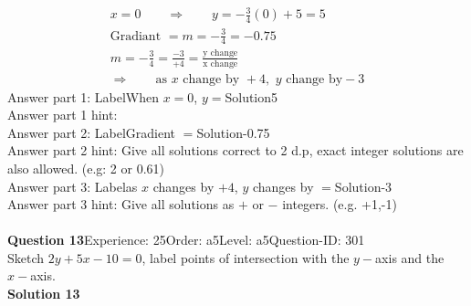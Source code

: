 \documentclass{article}
\begin{document}
\\[-35pt]\begin{align*}
&x=0\qquad\Rightarrow\qquad y=-\displaystyle\frac{3}{4}(0)+5=5&\\[2pt]
&\text{Gradiant}\,\,=m=-\displaystyle\frac{3}{4}=-0.75&\\[2pt]
&m=-\displaystyle\frac{3}{4}=\displaystyle\frac{-3}{+4}=\displaystyle\frac{\text{y change}}{\text{x change}}&\\[2pt]
& \Rightarrow\qquad \text{as}\,\, x \,\,\text{change by } +4,\,\, y\,\, \text{change by} -3 &
\end{align*}
Answer part 1: \hspace{10pt}Label\hspace{10pt}When $x=0$, $y=$\hspace{10pt}Solution\hspace{10pt}5\\
Answer part 1 hint: \hspace{15pt}\\
Answer part 2: \hspace{10pt}Label\hspace{10pt}Gradient $=$\hspace{10pt}Solution\hspace{10pt}-0.75\\
Answer part 2 hint: \hspace{15pt}Give all solutions correct to 2 d.p, exact integer solutions are also allowed. (e.g: 2 or 0.61)\\
Answer part 3: \hspace{10pt}Label\hspace{10pt}as $x$ changes by $+4$, $y$ changes by $=$\hspace{10pt}Solution\hspace{10pt}-3\\
Answer part 3 hint: \hspace{15pt}Give all solutions as $+$ or $-$ integers. (e.g. +1,-1)\\
\\[4pt]
\noindent\textbf{Question 13}\hspace{20pt}Experience: 25\hspace{20pt}Order: a5\hspace{20pt}Level: a5\hspace{20pt}Question-ID: 301\\[2pt]
Sketch $2y+5x-10=0$, label points of intersection with the $y-$axis and the $x-$axis.\\[4pt]
\noindent\textbf{Solution 13}\\[2pt]
\end{document}
